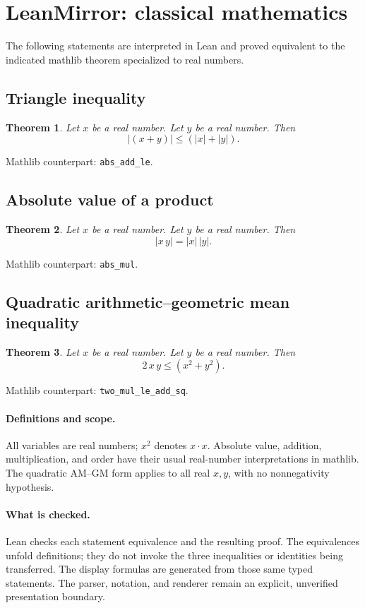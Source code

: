 \documentclass[11pt]{article}
\newtheorem*{statement}{Theorem}
\begin{document}
\section*{LeanMirror: classical mathematics}
The following statements are interpreted in Lean and proved equivalent to the indicated mathlib theorem specialized to real numbers.

\subsection*{Triangle inequality}
\begin{statement}
Let $x$ be a real number. Let $y$ be a real number. Then
\[
\left|\left(x + y\right)\right| \le \left(\left|x\right| + \left|y\right|\right).
\]
\end{statement}
Mathlib counterpart: \texttt{abs\_add\_le}.

\subsection*{Absolute value of a product}
\begin{statement}
Let $x$ be a real number. Let $y$ be a real number. Then
\[
\left|x\,y\right| = \left|x\right|\,\left|y\right|.
\]
\end{statement}
Mathlib counterpart: \texttt{abs\_mul}.

\subsection*{Quadratic arithmetic--geometric mean inequality}
\begin{statement}
Let $x$ be a real number. Let $y$ be a real number. Then
\[
2\,x\,y \le \left(x^{2} + y^{2}\right).
\]
\end{statement}
Mathlib counterpart: \texttt{two\_mul\_le\_add\_sq}.
\paragraph{Definitions and scope.} All variables are real numbers; $x^2$ denotes $x\cdot x$. Absolute value, addition, multiplication, and order have their usual real-number interpretations in mathlib. The quadratic AM--GM form applies to all real $x,y$, with no nonnegativity hypothesis.
\paragraph{What is checked.} Lean checks each statement equivalence and the resulting proof. The equivalences unfold definitions; they do not invoke the three inequalities or identities being transferred. The display formulas are generated from those same typed statements. The parser, notation, and renderer remain an explicit, unverified presentation boundary.
\end{document}
